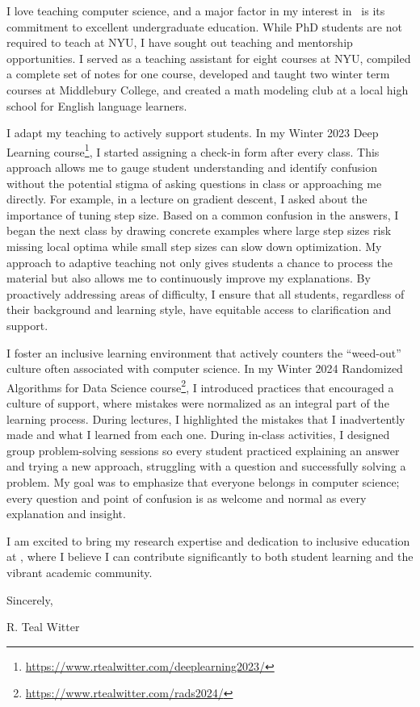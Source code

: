 \documentclass[11pt]{article}
\begin{document}
{I love teaching computer science, and a major factor in my interest in \school~is its commitment to excellent undergraduate education. While PhD students are not required to teach at NYU, I have sought out teaching and mentorship opportunities. I served as a teaching assistant for eight courses at NYU, compiled a complete set of notes for one course, developed and taught two winter term courses at Middlebury College, and created a math modeling club at a local high school for English language learners.

I adapt my teaching to actively support students. In my Winter 2023 Deep Learning course\footnote{\url{https://www.rtealwitter.com/deeplearning2023/}}, I started assigning a check-in form after every class. This approach allows me to gauge student understanding and identify confusion without the potential stigma of asking questions in class or approaching me directly. For example, in a lecture on gradient descent, I asked about the importance of tuning step size. Based on a common confusion in the answers, I began the next class by drawing concrete examples where large step sizes risk missing local optima while small step sizes can slow down optimization. My approach to adaptive teaching not only gives students a chance to process the material but also allows me to continuously improve my explanations. By proactively addressing areas of difficulty, I ensure that all students, regardless of their background and learning style, have equitable access to clarification and support.

I foster an inclusive learning environment that actively counters the “weed-out” culture often associated with computer science. In my Winter 2024 Randomized Algorithms for Data Science course\footnote{\url{https://www.rtealwitter.com/rads2024/}}, I introduced practices that encouraged a culture of support, where mistakes were normalized as an integral part of the learning process. During lectures, I highlighted the mistakes that I inadvertently made and what I learned from each one. During in-class activities, I designed group problem-solving sessions so every student practiced explaining an answer and trying a new approach, struggling with a question and successfully solving a problem. My goal was to emphasize that everyone belongs in computer science; every question and point of confusion is as welcome and normal as every explanation and insight.

I am excited to bring my research expertise and dedication to inclusive education at \school, where I believe I can contribute significantly to both student learning and the vibrant academic community.

Sincerely,

\vspace{1em}

{\bsifamily R. Teal Witter}

}
\end{document}
